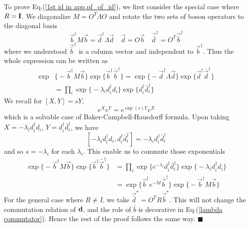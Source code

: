 To prove Eq.(\ref{1st id in app.pf_of_id}), we first consider the special case where $R={\bf I}$. We diagonalize $M = O^{T} \Lambda O $ and rotate the two sets of boson operators to the diagonal basis
\begin{equation}
  \vec{b}^{\dagger}  M \vec{b} = \vec{d}^{\dagger} \Lambda \vec{d}  \quad \vec{d} = O \vec{b} \quad \vec{\bar{d}}^\dagger = O^T \vec{\bar{b}}^\dagger
\end{equation}
where we understood $\vec{\bar{b}}^\dagger$ is a column vector and independent to $\vec{{b}}^\dagger$. Thus the whole expression can be written as
\begin{equation}
\begin{aligned}
  \exp&\Big\{- \vec{b}^{\dagger} M \vec{b}  \Big\} \exp \Big\{ \vec{b}^{\dagger} \bar{\vec{b}}^\dagger  \Big\}  =  
  \exp\Big\{- \vec{d}^{\dagger} \Lambda \vec{d}  \Big\} \exp \Big\{   \vec{d}^{\dagger} \bar{\vec{d}}^\dagger  \Big\} \\
& = \prod_i  \exp\Big\{- \lambda_i d_i^{\dagger} d_i  \Big\} \exp \Big\{  d_i^{\dagger} \bar{d}_i ^{\dagger}  \Big\}
\end{aligned}
\end{equation}
We recall for $ [X, Y] = sY $, 
\begin{equation}
  e^X e^{Y} = e^{\exp (s ) Y} e^{X}
\end{equation}
which is a solvable case of Baker-Campbell-Hausdorff formula. Upon taking $X = -\lambda_i d_i^{\dagger} d_i$, $Y = d_i^{\dagger} \bar{d}^{\dagger}_i$, we have
\begin{equation}
\label{lambda commutator}
[- \lambda_i d_i^{\dagger} d_i, d_i ^{\dagger} \bar{d}_i^{\dagger}] =  - \lambda_i  d_i ^{\dagger} \bar{d}_i^{\dagger} 
\end{equation}
and so $s = - \lambda_i$ for each $\lambda_i$. This enable us to commute those exponentials
\begin{equation}
\begin{aligned}
 \exp\Big\{- \vec{b}^{\dagger} M \vec{b}  \Big\} \exp \Big\{  \vec{b}^{\dagger} \bar{\vec{b}}^\dagger  \Big\}   &= \prod_i \exp \Big\{ e^{- \lambda_i }  d^{\dagger}_i \bar{d}^{\dagger}_i  \Big\}  \exp \Big\{-\lambda_i  d^{\dagger}_i d_i  \Big\} \\
 & = \exp \Big\{ \vec{b}^{\dagger} e^{-M}  \bar{\vec{b}}^\dagger  \Big\} \exp\Big\{- \vec{b}^{\dagger} M \vec{b}  \Big\} 
\end{aligned}
\end{equation}
For the general case where $R \ne I$, we take $\vec{\bar{d}}^* = O^T R \vec{\bar{b}}^*$. This will not change the commutation relation of ${\bf d}$, and the role of $\bar{b}$ is decorative in Eq.(\ref{lambda commutator}). Hence the rest of the proof follows the same way. \hfill$\blacksquare$

